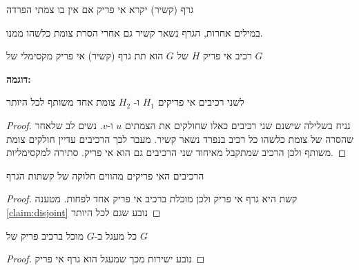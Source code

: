 \begin{definition}
גרף (קשיר) יקרא אי פריק אם אין בו צמתי הפרדה
\end{definition}

במילים אחרות, הגרף נשאר קשיר גם אחרי הסרת צומת כלשהו ממנו.

\begin{definition}
רכיב אי פריק $H$ של $G$ הוא תת גרף (קשיר) אי פריק מקסימלי של $G$
\end{definition}

\textbf{דוגמה:}
\begin{center}
\end{center}

\begin{claim}
\label{claim:disjoint}
לשני רכיבים אי פריקים
$H_1$
ו-%
$H_2$
צומת אחד משותף לכל היותר
\end{claim}
\begin{proof}
נניח בשלילה שישנם שני רכיבים כאלו שחולקים את הצמתים $u$ ו-$v$.
נשים לב שלאחר שהסרה של צומת כלשהו כל רכיב בנפרד נשאר קשיר.
מעבר לכך הרכיבים עדיין חולקים צומת משותף ולכן הרכיב שמתקבל מאיחוד שני הרכיבים גם הוא אי פריק.
סתירה למקסימליות.
\end{proof}

\begin{claim}
הרכיבים האי פריקים מהווים חלוקה של קשתות הגרף
\end{claim}
\begin{proof}
קשת היא גרף אי פריק ולכן מוכלת ברכיב אי פריק אחד לפחות. 
מטענה 
\ref{claim:disjoint}
נובע שגם לכל היותר

\end{proof}
\begin{claim}
כל מעגל ב-$G$ מוכל ברכיב פריק של $G$
\end{claim}
\begin{proof}
נובע ישירות מכך שמעגל הוא גרף אי פריק 
\end{proof}

